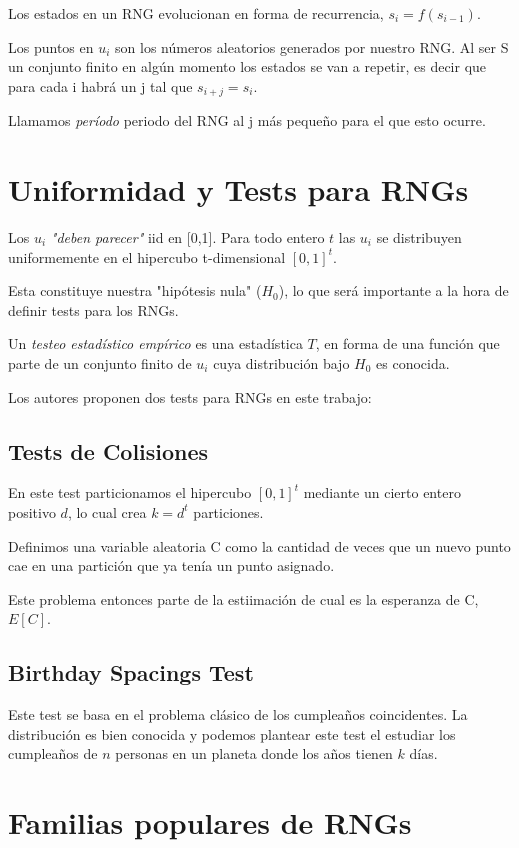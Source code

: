 \documentclass[11pt]{article}
\begin{document}
Los estados en un RNG evolucionan en forma de recurrencia, $s_i = f(s_{i-1})$.

Los puntos en $u_i$ son los números aleatorios generados por nuestro RNG. Al ser S un conjunto finito en algún momento los estados se van a repetir, es decir que para cada i habrá un j tal que $s_{i+j} = s_i$. 

Llamamos \textit{período} periodo del RNG al j más pequeño para el que esto ocurre.

\section{Uniformidad y Tests para RNGs}

Los $u_i$ \textit{"deben parecer"} iid en [0,1]. Para todo entero $t$ las $u_i$ se distribuyen uniformemente en el hipercubo t-dimensional $[0,1]^t$.

Esta constituye nuestra "hipótesis nula" ($H_0$), lo que será importante a la hora de definir tests para los RNGs.

Un \textit{testeo estadístico empírico} es una estadística $T$, en forma de una función que parte de un conjunto finito de $u_i$ cuya distribución bajo $H_0$ es conocida.

Los autores proponen dos tests para RNGs en este trabajo:

\subsection{Tests de Colisiones}

En este test particionamos el hipercubo $[0,1]^t$ mediante un cierto entero positivo $d$, lo cual crea $k=d^t$ particiones.

Definimos una variable aleatoria C como la cantidad de veces que un nuevo punto cae en una partición que ya tenía un punto asignado. 

Este problema entonces parte de la estiimación de cual es la esperanza de C, $E[C]$.

\subsection{Birthday Spacings Test}

Este test se basa en el problema clásico de los cumpleaños coincidentes. La distribución es bien conocida y podemos plantear este test el estudiar los cumpleaños de $n$ personas en un planeta donde los años tienen $k$ días.

\section{Familias populares de RNGs}
\end{document}
